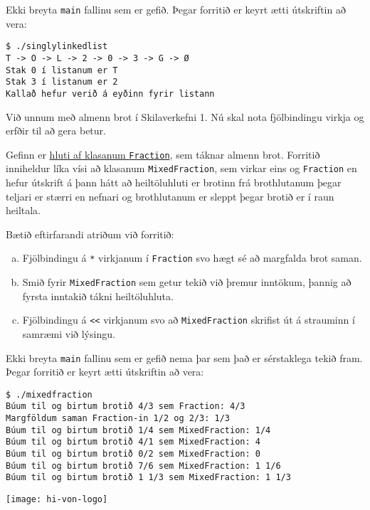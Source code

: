 \documentclass{article}
\begin{document}
Ekki breyta \texttt{main} fallinu sem er gefið. Þegar forritið er keyrt ætti útskriftin að vera:

\begin{verbatim}
$ ./singlylinkedlist
T -> O -> L -> 2 -> 0 -> 3 -> G -> Ø
Stak 0 í listanum er T
Stak 3 í listanum er 2
Kallað hefur verið á eyðinn fyrir listann
\end{verbatim}

\question

Við unnum með almenn brot í Skilaverkefni 1. Nú skal nota fjölbindingu virkja og erfðir til að gera betur.

Gefinn er \href{https://raw.githubusercontent.com/Ernir/kennsluefni/master/T2/Code/w3/mixedfraction.cpp}{hluti af klasanum \texttt{Fraction}}, sem táknar almenn brot. Forritið inniheldur líka vísi að klasanum \texttt{MixedFraction}, sem virkar eins og \texttt{Fraction} en hefur útskrift á þann hátt að heiltöluhluti er brotinn frá brothlutanum þegar teljari er stærri en nefnari og brothlutanum er sleppt þegar brotið er í raun heiltala.

Bætið eftirfarandi atriðum við forritið:

\begin{enumerate}[a)]
	\item Fjölbindingu á \texttt{*} virkjanum í \texttt{Fraction} svo hægt sé að margfalda brot saman.
    \item Smið fyrir \texttt{MixedFraction} sem getur tekið við þremur inntökum, þannig að fyrsta inntakið tákni heiltöluhluta.
    \item Fjölbindingu á \texttt{<<} virkjanum svo að \texttt{MixedFraction} skrifist út á strauminn í samræmi við lýsingu.
\end{enumerate}

Ekki breyta \texttt{main} fallinu sem er gefið nema þar sem það er sérstaklega tekið fram. Þegar forritið er keyrt ætti útskriftin að vera:

\begin{verbatim}
$ ./mixedfraction
Búum til og birtum brotið 4/3 sem Fraction: 4/3
Margföldum saman Fraction-in 1/2 og 2/3: 1/3
Búum til og birtum brotið 1/4 sem MixedFraction: 1/4
Búum til og birtum brotið 4/1 sem MixedFraction: 4
Búum til og birtum brotið 0/2 sem MixedFraction: 0
Búum til og birtum brotið 7/6 sem MixedFraction: 1 1/6
Búum til og birtum brotið 1 1/3 sem MixedFraction: 1 1/3
\end{verbatim}

\vfill
\texttt{[image: hi-von-logo]}
\end{document}
